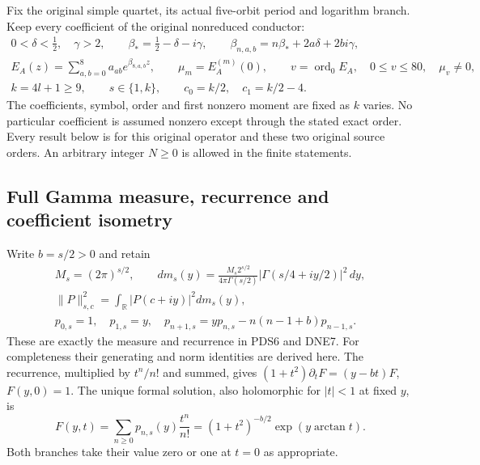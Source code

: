 \documentclass[11pt,a4paper]{article}
\begin{document}
Fix the original simple quartet, its actual five-orbit period and logarithm
branch. Keep every coefficient of the original nonreduced conductor:
\[
\begin{gathered}
 0<\delta<\tfrac12,\quad\gamma>2,\qquad
 \beta_*=\tfrac12-\delta-i\gamma,\qquad
 \beta_{n,a,b}=n\beta_*+2a\delta+2bi\gamma,\\
 E_A(z)=\sum_{a,b=0}^8a_{ab}e^{\beta_{8,a,b}z},\qquad
 \mu_m=E_A^{(m)}(0),\qquad
 v=\operatorname{ord}_0E_A,\quad0\le v\le80,\quad\mu_v\ne0,\\
 k=4l+1\ge9,\qquad s\in\{1,k\},\qquad
 c_0=k/2,\quad c_1=k/2-4 .
\end{gathered}\tag{SGT1}
\]
The coefficients, symbol, order and first nonzero moment are fixed as
$k$ varies. No particular coefficient is assumed nonzero except through
the stated exact order. Every result below is for this original operator
and these two original source orders. An arbitrary integer $N\ge0$ is
allowed in the finite statements.

\subsection{Full Gamma measure, recurrence and coefficient isometry}

Write $b=s/2>0$ and retain
\[
\begin{gathered}
 M_s=(2\pi)^{s/2},\qquad
 dm_s(y)=\frac{M_s2^{s/2}}{4\pi\Gamma(s/2)}
               |\Gamma(s/4+iy/2)|^2\,dy,\\
 \|P\|_{s,c}^2=\int_{\mathbb R}|P(c+iy)|^2dm_s(y),\\
 p_{0,s}=1,\quad p_{1,s}=y,\quad
 p_{n+1,s}=yp_{n,s}-n(n-1+b)p_{n-1,s}.
\end{gathered}\tag{SGT2}
\]
These are exactly the measure and recurrence in PDS6 and DNE7.
For completeness their generating and norm identities are derived here.
The recurrence, multiplied by $t^n/n!$ and summed, gives
$(1+t^2)\partial_t F=(y-bt)F$, $F(y,0)=1$. The unique formal solution,
also holomorphic for $|t|<1$ at fixed $y$, is
\[
 F(y,t)=\sum_{n\ge0}p_{n,s}(y)\frac{t^n}{n!}
       =(1+t^2)^{-b/2}\exp(y\arctan t).
 \tag{SGT3}
\]
Both branches take their value zero or one at $t=0$ as appropriate.
\end{document}
